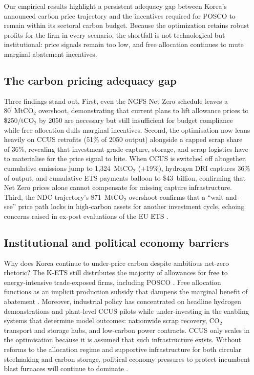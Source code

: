 \documentclass[preprint,1p,authoryear]{elsarticle}
\begin{document}
Our empirical results highlight a persistent adequacy gap between Korea's announced carbon price trajectory and the incentives required for POSCO to remain within its sectoral carbon budget. Because the optimization retains robust profits for the firm in every scenario, the shortfall is not technological but institutional: price signals remain too low, and free allocation continues to mute marginal abatement incentives.

\subsection{The carbon pricing adequacy gap}

Three findings stand out. First, even the NGFS Net Zero schedule leaves a 80~MtCO$_2$ overshoot, demonstrating that current plans to lift allowance prices to \$250/tCO$_2$ by 2050 are necessary but still insufficient for budget compliance while free allocation dulls marginal incentives. Second, the optimisation now leans heavily on CCUS retrofits (51\% of 2050 output) alongside a capped scrap share of 36\%, revealing that investment-grade capture, storage, and scrap logistics have to materialise for the price signal to bite. When CCUS is switched off altogether, cumulative emissions jump to 1,324~MtCO$_2$ (+19\%), hydrogen DRI captures 36\% of output, and cumulative ETS payments balloon to \$43~billion, confirming that Net Zero prices alone cannot compensate for missing capture infrastructure. Third, the NDC trajectory's 871~MtCO$_2$ overshoot confirms that a “wait-and-see” price path locks in high-carbon assets for another investment cycle, echoing concerns raised in ex-post evaluations of the EU ETS \citep{Green2021, martin2016industry}.

\subsection{Institutional and political economy barriers}

Why does Korea continue to under-price carbon despite ambitious net-zero rhetoric? The K-ETS still distributes the majority of allowances for free to energy-intensive trade-exposed firms, including POSCO \citep{kim2021kets, ICAP2024}. Free allocation functions as an implicit production subsidy that dampens the marginal benefit of abatement \citep{sartor2012benchmark}. Moreover, industrial policy has concentrated on headline hydrogen demonstrations and plant-level CCUS pilots while under-investing in the enabling systems that determine model outcomes: nationwide scrap recovery, CO$_2$ transport and storage hubs, and low-carbon power contracts. CCUS only scales in the optimisation because it is assumed that such infrastructure exists. Without reforms to the allocation regime and supportive infrastructure for both circular steelmaking and carbon storage, political economy pressures to protect incumbent blast furnaces will continue to dominate \citep{MaterialEconomics2019}.
\end{document}
